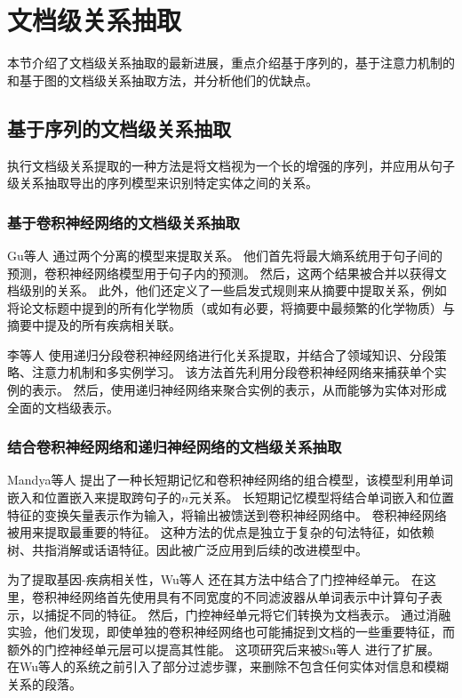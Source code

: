 \documentclass[bachelor]{thesis-uestc}
\begin{document}
\section{文档级关系抽取}
本节介绍了文档级关系抽取的最新进展，重点介绍基于序列的，基于注意力机制的和基于图的文档级关系抽取方法，并分析他们的优缺点。

\subsection{基于序列的文档级关系抽取}
执行文档级关系提取的一种方法是将文档视为一个长的增强的序列，并应用从句子级关系抽取导出的序列模型来识别特定实体之间的关系。

\subsubsection{基于卷积神经网络的文档级关系抽取}
Gu等人 \cite{10.1093/database/bax024}通过两个分离的模型来提取关系。
他们首先将最大熵系统用于句子间的预测，卷积神经网络模型用于句子内的预测。
然后，这两个结果被合并以获得文档级别的关系。
此外，他们还定义了一些启发式规则来从摘要中提取关系，例如将论文标题中提到的所有化学物质（或如有必要，将摘要中最频繁的化学物质）与摘要中提及的所有疾病相关联。\par

李等人 \cite{li2018chemical}
使用递归分段卷积神经网络进行化关系提取，并结合了领域知识、分段策略、注意力机制和多实例学习。
该方法首先利用分段卷积神经网络来捕获单个实例的表示。
然后，使用递归神经网络来聚合实例的表示，从而能够为实体对形成全面的文档级表示。

\subsubsection{结合卷积神经网络和递归神经网络的文档级关系抽取}
Mandya等人 \cite{mandya2018combining}提出了一种长短期记忆和卷积神经网络的组合模型，该模型利用单词嵌入和位置嵌入来提取跨句子的$n$元关系。
长短期记忆模型将结合单词嵌入和位置特征的变换矢量表示作为输入，将输出被馈送到卷积神经网络中。
卷积神经网络被用来提取最重要的特征。
这种方法的优点是独立于复杂的句法特征，如依赖树、共指消解或话语特征。因此被广泛应用到后续的改进模型中。

为了提取基因-疾病相关性，Wu等人 \cite{GDA}还在其方法中结合了门控神经单元。
在这里，卷积神经网络首先使用具有不同宽度的不同滤波器从单词表示中计算句子表示，以捕捉不同的特征。
然后，门控神经单元将它们转换为文档表示。
通过消融实验，他们发现，即使单独的卷积神经网络也可能捕捉到文档的一些重要特征，而额外的门控神经单元层可以提高其性能。
这项研究后来被Su等人 \cite{renet2} 进行了扩展。
在Wu等人的系统之前引入了部分过滤步骤，来删除不包含任何实体对信息和模糊关系的段落。
\end{document}
